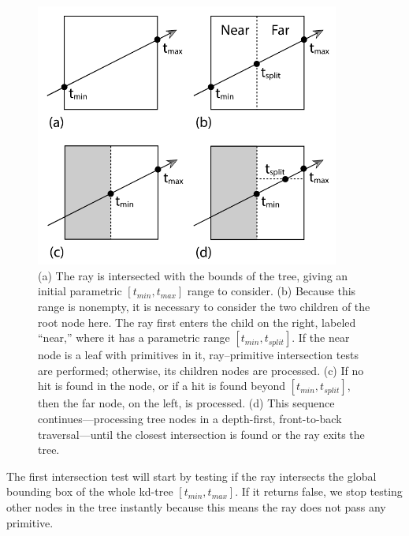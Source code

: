 \documentclass[11pt,a4paper]{article}
\begin{document}
\begin{figure}[H]	
     \centering
         \includegraphics[width=10cm]{images/kdtree/traversal.png}
        \caption{(a) The ray is intersected with the bounds of the tree, giving an initial parametric $[t_{min}, t_{max}]$ range to consider. (b) Because this range is nonempty, it is necessary to consider the two children of the root node here. The ray first enters the child on the right, labeled “near,” where it has a parametric range $[t_{min}, t_{split}]$. If the near node is a leaf with primitives in it, ray–primitive intersection tests are performed; otherwise, its children nodes are processed. (c) If no hit is found in the node, or if a hit is found beyond $[t_{min}, t_{split}]$, then the far node, on the left, is processed. (d) This sequence continues—processing tree nodes in a depth-first, front-to-back traversal—until the closest intersection is found or the ray exits the tree. \protect\cite{Pharr2016}}
        \label{fig:dice}
\end{figure}


The first intersection test will start by testing if the ray intersects the global bounding box of the whole kd-tree $[t_{min}, t_{max}]$. If it returns false, we stop testing other nodes in the tree instantly because this means the ray does not pass any primitive.
\\
\noindent
\end{document}
